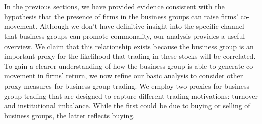 \section{ }

\begin{LTR}
	In the previous sections, we have provided evidence consistent with the hypothesis that the presence of firms in the business groups can raise firms' co-movement. Although we don't have definitive insight into the specific channel that business groups can promote commonality, our analysis provides a useful overview.
	We claim that this relationship exists because the business group is an important proxy for the likelihood that trading in these stocks will be correlated. To gain a clearer understanding of how the business group is able to generate co-movement in firms' return, we now refine our basic analysis to consider other proxy measures for business group trading.
	We employ two proxies for business group trading that are designed to capture different trading motivations: turnover and institutional imbalance. While the first could be due to buying or selling of business groups, the latter reflects buying.
	
	
\end{LTR}




\subsection{}

